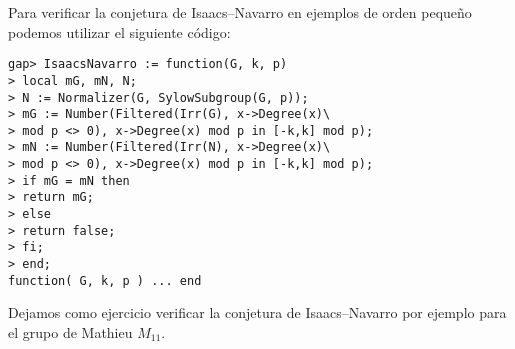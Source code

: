 Para verificar la conjetura de Isaacs--Navarro en 
ejemplos de orden pequeño podemos utilizar el siguiente código:

\begin{lstlisting}
gap> IsaacsNavarro := function(G, k, p)
> local mG, mN, N;
> N := Normalizer(G, SylowSubgroup(G, p));
> mG := Number(Filtered(Irr(G), x->Degree(x)\
> mod p <> 0), x->Degree(x) mod p in [-k,k] mod p);
> mN := Number(Filtered(Irr(N), x->Degree(x)\
> mod p <> 0), x->Degree(x) mod p in [-k,k] mod p);
> if mG = mN then
> return mG;
> else
> return false;
> fi;
> end;
function( G, k, p ) ... end
\end{lstlisting}

Dejamos como ejercicio verificar la conjetura de Isaacs--Navarro 
por ejemplo para el grupo de Mathieu $M_{11}$. 